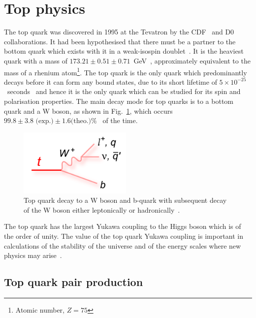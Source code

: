 \section{Top physics}
The top quark was discovered in 1995 at the Tevatron by the CDF~\cite{PhysRevLett.74.2626} and D0~\cite{Abachi:1995iq} collaborations. It had been hypothesised that there must be a partner to the bottom quark which exists with it in a weak-isospin doublet~\cite{Kobayashi:1973fv}. It is the heaviest quark with a mass of $173.21\pm0.51\pm0.71$~GeV~\cite{PDG2016}, approximately equivalent to the mass of a rhenium atom\footnote{Atomic number, $Z = 75$}. The top quark is the only quark which predominantly decays before it can form any bound states, due to its short lifetime of $5\times10^{-25}$~seconds~\cite{PDG2016} and hence it is the only quark which can be studied for its spin and polarisation properties. The main decay mode for top quarks is to a bottom quark and a W boson, as shown in Fig.~\ref{fig:tdecay}, which occurs $99.8\pm3.8\textrm{ (exp.)}\pm1.6\textrm {(theo.)} \%$~\cite{2014arXiv1403.7366C} of the time.
\begin{figure}[ht!]
\begin{center}
    \includegraphics[width=0.49\textwidth]{images/Theory/topdecay.png}
    \caption{Top quark decay to a W boson and b-quark with subsequent decay of the W boson either leptonically or hadronically~\cite{tdecaysource}.}
    \label{fig:tdecay}
\end{center}
\end{figure}

The top quark has the largest Yukawa coupling to the Higgs boson which is of the order of unity. The value of the top quark Yukawa coupling is important in calculations of the stability of the universe and of the energy scales where new physics may arise~\cite{Bezrukov:2014ina}.

\subsection{Top quark pair production}

